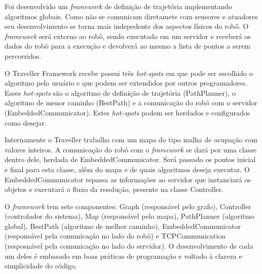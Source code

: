 Foi desenvolvido um \textit{framework} de definição de trajetória implementando algoritmos globais. Como não se comunicam diretamete com sensores e atuadores seu desenvolvimento se torna mais indepedente dos aspectos físicos do robô. O \textit{framework} será externo ao robô, sendo executado em um servidor e receberá os dados do robô para a execução e devolverá ao mesmo a lista de pontos a serem percorridos.

O Traveller Framework recebe possui três \textit{hot-spots} em que pode ser escolhido o algoritmo pelo usuário e que podem ser extendidos por outros programadores. Esses \textit{hot-spots} são o algoritmo de definição de trajetória (PathPlanner), o algoritmo de menor caminho (BestPath) e a comunicação do robô com o servidor (EmbeddedCommunicator). Estes \textit{hot-spots} podem ser herdados e configurados como desejar.

Internamente o Traveller trabalha com um mapa do tipo malha de ocupação com valores inteiros. A comunicação do robô com o \textit{framework} se dará por uma classe dentro dele, herdada de EmbeddedCommunicator. Será passado os pontos inicial e final para esta classe, além do mapa e de quais algoritmos deseja executar. O EmbeddedCommunicator repassa as informações ao servidor que instanciará os objetos e executará o fluxo da resolução, presente na classe Controller.

O \textit{framework} tem sete componentes: Graph (responsável pelo grafo), Controller (controlador do sistema), Map (responsável pelo mapa), PathPlanner (algoritmo global), BestPath (algoritmo de melhor caminho), EmbeddedCommunicator (responsável pela comunicação no lado do robô) e TCPCommunication (resposnável pela comunicação no lado do servidor). O desenvolvimento de cada um deles é embasado em boas práticas de programação e voltado à clareza e simplicidade do código.